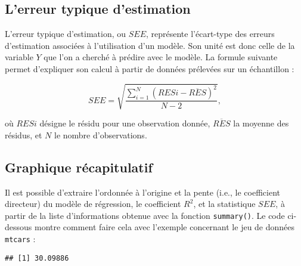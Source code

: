 \documentclass[
  french,
]{book}
\newenvironment{Shaded}{\begin{snugshade}}{\end{snugshade}}
\newcommand{\CommentTok}[1]{\textcolor[rgb]{0.56,0.35,0.01}{\textit{#1}}}
\newcommand{\DecValTok}[1]{\textcolor[rgb]{0.00,0.00,0.81}{#1}}
\newcommand{\KeywordTok}[1]{\textcolor[rgb]{0.13,0.29,0.53}{\textbf{#1}}}
\newcommand{\NormalTok}[1]{#1}
\newcommand{\OperatorTok}[1]{\textcolor[rgb]{0.81,0.36,0.00}{\textbf{#1}}}
\newcommand{\StringTok}[1]{\textcolor[rgb]{0.31,0.60,0.02}{#1}}
\begin{document}
\hypertarget{lerreur-typique-destimation}{%
\subsection{L'erreur typique d'estimation}\label{lerreur-typique-destimation}}

L'erreur typique d'estimation, ou \(SEE\), représente l'écart-type des erreurs d'estimation associées à l'utilisation d'un modèle. Son unité est donc celle de la variable \(Y\) que l'on a cherché à prédire avec le modèle. La formule suivante permet d'expliquer son calcul à partir de données prélevées sur un échantillon :

\[ SEE = \sqrt{\frac{\sum_{i=1}^{N}(RES{i} - \overline{RES})^2}{N-2}}, \]

où \(RES{i}\) désigne le résidu pour une observation donnée, \(\overline{RES}\) la moyenne des résidus, et \(N\) le nombre d'observations.

\hypertarget{graphique-ruxe9capitulatif}{%
\subsection{Graphique récapitulatif}\label{graphique-ruxe9capitulatif}}

Il est possible d'extraire l'ordonnée à l'origine et la pente (i.e., le coefficient directeur) du modèle de régression, le coefficient \(R^2\), et la statistique \(SEE\), à partir de la liste d'informations obtenue avec la fonction \texttt{summary()}. Le code ci-dessous montre comment faire cela avec l'exemple concernant le jeu de données \texttt{mtcars} :

\begin{Shaded}
\end{Shaded}

\begin{verbatim}
## [1] 30.09886
\end{verbatim}

\begin{Shaded}
\end{Shaded}
\end{document}
